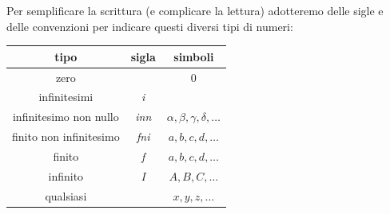 Per semplificare la scrittura (e complicare la lettura) adotteremo delle 
sigle e delle convenzioni per indicare questi diversi tipi di numeri:

\begin{center}
\begin{tabular}{ccc}\toprule
tipo & sigla & simboli \\\midrule

zero &  & 0 \\

infinitesimi & \emph{i} & \\

infinitesimo non nullo & \emph{inn} & 
\(\alpha, \beta, \gamma, \delta, \dots\) \\

finito non infinitesimo & \emph{fni} & \(a, b, c, d, \dots\)\\

finito & \emph{f} & \(a, b, c, d, \dots\) \\

infinito & \emph{I} & \(A, B, C, \dots\)\\

qualsiasi &  & \(x, y, z, \dots\) \\\bottomrule
\end{tabular}
\label{tab:insnum_tipi}
\end{center}

